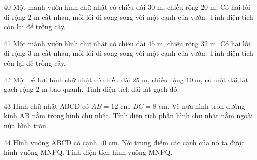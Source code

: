 \gap
\begin{probbox}{40}{}
Một mảnh vườn hình chữ nhật có chiều dài $30$ m, chiều rộng $20$ m. Có hai lối đi rộng $2$ m cắt nhau, mỗi lối đi song song với một cạnh của vườn. Tính diện tích còn lại để trồng cây.
\end{probbox}
\gap
\begin{probbox}{41}{}
Một mảnh vườn hình chữ nhật có chiều dài $45$ m, chiều rộng $32$ m. Có hai lối đi rộng $3$ m cắt nhau, mỗi lối đi song song với một cạnh của vườn. Tính diện tích còn lại để trồng cây.
\end{probbox}
\gap
\begin{probbox}{42}{}
Một bể bơi hình chữ nhật có chiều dài $25$ m, chiều rộng $10$ m, có một dải lát gạch rộng $2$ m bao quanh. Tính diện tích dải lát gạch đó.
\end{probbox}
\gap
\begin{probbox}{43}{}
Hình chữ nhật ABCD có $AB=12$ cm, $BC=8$ cm. Vẽ nửa hình tròn đường kính AB nằm trong hình chữ nhật. Tính diện tích phần hình chữ nhật nằm ngoài nửa hình tròn.
\end{probbox}
\gap
\begin{probbox}{44}{}
Hình vuông ABCD có cạnh $10$ cm. Nối trung điểm các cạnh của nó ta được hình vuông MNPQ. Tính diện tích hình vuông MNPQ.
\end{probbox}
